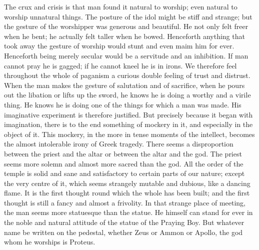 The crux and crisis is that man found it natural to worship; even natural to worship unnatural things. The posture of the idol might be stiff and strange; but the gesture of the worshipper was generous and beautiful. He not only felt freer when he bent; he actually felt taller when he bowed. Henceforth anything that took away the gesture of worship would stunt and even maim him for ever. Henceforth being merely secular would be a servitude and an inhibition. If man cannot pray he is gagged; if he cannot kneel he is in irons. We therefore feel throughout the whole of paganism a curious double feeling of trust and distrust. When the man makes the gesture of salutation and of sacrifice, when he pours out the libation or lifts up the sword, he knows he is doing a worthy and a virile thing. He knows he is doing one of the things for which a man was made. His imaginative experiment is therefore justified. But precisely because it began with imagination, there is to the end something of mockery in it, and especially in the object of it. This mockery, in the more in tense moments of the intellect, becomes the almost intolerable irony of Greek tragedy. There seems a disproportion between the priest and the altar or between the altar and the god. The priest seems more solemn and almost more sacred than the god. All the order of the temple is solid and sane and satisfactory to certain parts of our nature; except the very centre of it, which seems strangely mutable and dubious, like a dancing flame. It is the first thought round which the whole has been built; and the first thought is still a fancy and almost a frivolity. In that strange place of meeting, the man seems more statuesque than the statue. He himself can stand for ever in the noble and natural attitude of the statue of the Praying Boy. But whatever name be written on the pedestal, whether Zeus or Ammon or Apollo, the god whom he worships is Proteus.

